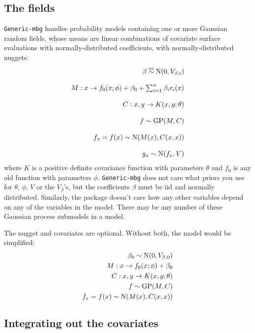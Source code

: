 \subsection{The fields}

\texttt{Generic-mbg} handles probability models containing one or more Gaussian random fields, whose means are linear combinations of covariate surface evaluations with normally-distributed coefficients, with normally-distributed nuggets:
\begin{equation}
    \label{eq:canonical} 
    \begin{array}{r}
        \beta \stackrel{\textup{\tiny iid}}{\sim} \textup{N}(0,V_{\beta,i}) \\\\
        M:x\rightarrow f_0(x;\phi) + \beta_0 + \sum_{i=1}^n \beta_i c_i(x)\\\\
        C:x,y\rightarrow K(x,y;\theta)\\\\
        f \sim \textup{GP}(M,C)\\\\
        f_x = f(x) \sim \textup{N}(M(x), C(x,x))\\\\
        g_x \sim \textup{N}(f_x, V) 
    \end{array}
\end{equation}
where $K$ is a positive definite covariance function with parameters $\theta$ and $f_0$ is any old function with parameters $\phi$. \texttt{Generic-mbg} does not care what priors you use for $\theta$, $\phi$, $V$ or the $V_\beta$'s, but the coefficients $\beta$ must be iid and normally distributed. Similarly, the package doesn't care how any other variables depend on any of the variables in the model. There may be any number of these Gaussian process submodels in a model.

The nugget and covariates are optional. Without both, the model would be simplified:
\begin{eqnarray*}
    \beta_0\sim\textup{N}(0,V_{\beta,0})\\
    M:x\rightarrow f_0(x;\phi) + \beta_0\\
    C:x,y\rightarrow K(x,y;\theta)\\
    f \sim \textup{GP}(M,C)\\
    f_x = f(x) \sim \textup{N}(M(x), C(x,x))
\end{eqnarray*}

\subsection{Integrating out the covariates}

